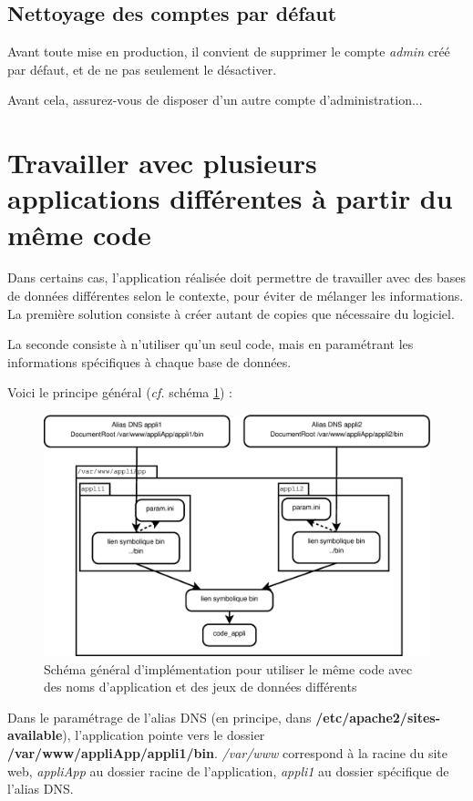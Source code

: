 \subsection{Nettoyage des comptes par défaut}

Avant toute mise en production, il convient de supprimer le compte \textit{admin} créé par défaut, et de ne pas seulement le désactiver. 

Avant cela, assurez-vous de disposer d'un autre compte d'administration...

\section{Travailler avec plusieurs applications différentes à partir du même code}\label{dnsmultiple}

Dans certains cas, l'application réalisée doit permettre de travailler avec des bases de données différentes selon le contexte, pour éviter de mélanger les informations. La première solution consiste à créer autant de copies que nécessaire du logiciel.

La seconde consiste à n'utiliser qu'un seul code, mais en paramétrant les informations spécifiques à chaque base de données.

Voici le principe général (\textit{cf.} schéma \ref{dnsmultipleschema})  :
\begin{figure}[th]
\label{dnsmultipleschema}
\includegraphics[width=\linewidth]{dessin/dnsmultiple}
\caption{Schéma général d'implémentation pour utiliser le même code avec des noms d'application et des jeux de données différents}
\end{figure}

Dans le paramétrage de l'alias DNS (en principe, dans \textbf{/etc/apache2/sites-available}), l'application pointe vers le dossier \textbf{/var/www/appliApp/appli1/bin}. 
\textit{/var/www} correspond à la racine du site web, \textit{appliApp} au dossier racine de l'application, \textit{appli1} au dossier spécifique de l'alias DNS.


